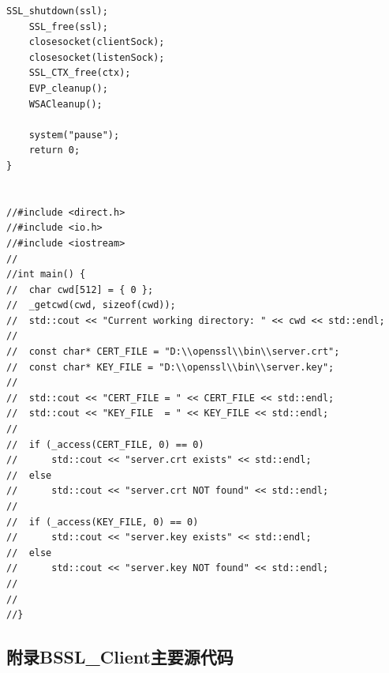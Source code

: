 ﻿\documentclass[12pt]{ctexart}
\begin{document}
\begin{lstlisting}[escapechar=c++|]
    SSL_shutdown(ssl);
    SSL_free(ssl);
    closesocket(clientSock);
    closesocket(listenSock);
    SSL_CTX_free(ctx);
    EVP_cleanup();
    WSACleanup();

    system("pause");
    return 0;
}


//#include <direct.h>
//#include <io.h>
//#include <iostream>
//
//int main() {
//	char cwd[512] = { 0 };
//	_getcwd(cwd, sizeof(cwd));
//	std::cout << "Current working directory: " << cwd << std::endl;
//
//	const char* CERT_FILE = "D:\\openssl\\bin\\server.crt";
//	const char* KEY_FILE = "D:\\openssl\\bin\\server.key";
//
//	std::cout << "CERT_FILE = " << CERT_FILE << std::endl;
//	std::cout << "KEY_FILE  = " << KEY_FILE << std::endl;
//
//	if (_access(CERT_FILE, 0) == 0)
//		std::cout << "server.crt exists" << std::endl;
//	else
//		std::cout << "server.crt NOT found" << std::endl;
//
//	if (_access(KEY_FILE, 0) == 0)
//		std::cout << "server.key exists" << std::endl;
//	else
//		std::cout << "server.key NOT found" << std::endl;
//
//
//}
\end{lstlisting}



\subsection*{附录B\quad SSL\_Client主要源代码}
\end{document}
